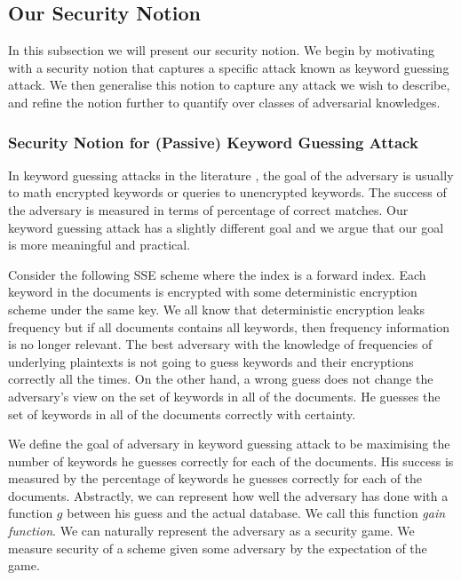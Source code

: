 \subsection{Our Security Notion}
In this subsection we will present our security notion. We begin by motivating with a security notion that captures a specific attack known as keyword guessing attack. We then generalise this notion to capture any attack we wish to describe, and refine the notion further to quantify over classes of adversarial knowledges.




\subsubsection{Security Notion for (Passive) Keyword Guessing Attack}
In keyword guessing attacks in the literature \cite{CCS:NavKamWri15, NDSS:IslKuzKan12, CCS:PouWri16, CCS:CGPR15}, the goal of the adversary is usually to math encrypted keywords or queries to unencrypted keywords. The success of the adversary is measured in terms of percentage of correct matches. Our keyword guessing attack has a slightly different goal and we argue that our goal is more meaningful and practical.

Consider the following SSE scheme where the index is a forward index. Each keyword in the documents is encrypted with some deterministic encryption scheme under the same key. We all know that deterministic encryption leaks frequency but if all documents contains all keywords, then frequency information is no longer relevant. The best adversary with the knowledge of frequencies of underlying plaintexts is not going to guess keywords and their encryptions correctly all the times. On the other hand, a wrong guess does not change the adversary's view on the set of keywords in all of the documents. He guesses the set of keywords in all of the documents correctly with certainty.

We define the goal of adversary in keyword guessing attack to be maximising the number of keywords he guesses correctly for each of the documents. His success is measured by the percentage of keywords he guesses correctly for each of the documents. Abstractly, we can represent how well the adversary has done with a function $g$ between his guess and the actual database. We call this function \textit{gain function}. We can naturally represent the adversary as a security game. We measure security of a scheme given some adversary by the expectation of the game.

